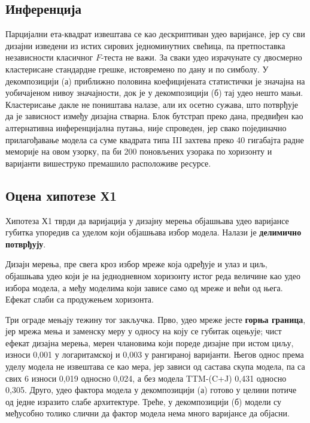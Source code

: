 \subsection{Инференција}

Парцијални ета-квадрат извештава се као дескриптиван удео варијансе, јер су сви дизајни
изведени из истих сирових једноминутних свећица, па претпоставка независности класичног
$F$-теста не важи. За сваки удео израчунате су двосмерно кластерисане стандардне грешке,
истовремено по дану и по симболу. У декомпозицији (а) приближно половина коефицијената
статистички је значајна на уобичајеном нивоу значајности, док је у декомпозицији (б) тај
удео нешто мањи. Кластерисање дакле
не поништава налазе, али их осетно сужава, што потврђује да је зависност између дизајна
стварна. Блок бутстрап преко дана, предвиђен као алтернативна инференцијална путања, није
спроведен, јер свако појединачно прилагођавање модела са суме квадрата типа III захтева
преко 40 гигабајта радне меморије на овом узорку, па би 200 поновљених узорака
по хоризонту и варијанти вишеструко премашило расположиве ресурсе.

\subsection{Оцена хипотезе Х1}
\label{subsec:ocena-h1}

Хипотеза Х1 тврди да варијација у дизајну мерења објашњава удео варијансе губитка
упоредив са уделом који објашњава избор модела. Налази је \textbf{делимично потврђују}.

Дизајн мерења, пре свега кроз избор мреже која одређује и улаз и циљ, објашњава удео
који је на једнодневном хоризонту истог реда величине као удео избора модела, а међу
моделима који зависе само од мреже и већи од њега. Ефекат слаби са продужењем хоризонта.

Три ограде мењају тежину тог закључка. Прво, удео мреже јесте \textbf{горња граница},
јер мрежа мења и заменску меру у односу на коју се губитак оцењује; чист ефекат дизајна мерења,
мерен члановима који пореде дизајне при истом циљу, износи 0,001 у логаритамској и 0,003
у рангираној варијанти. Његов однос према уделу модела не извештава се као мера, јер
зависи од састава скупа модела, па са свих 6 износи 0,019 односно 0,024, а без модела
TTM-(C+J) 0,431 односно 0,305. Друго,
удео фактора модела у декомпозицији (а) готово у целини потиче од једне изразито слабе
архитектуре. Треће, у декомпозицији (б) модели су међусобно толико слични да фактор
модела нема много варијансе да објасни.

